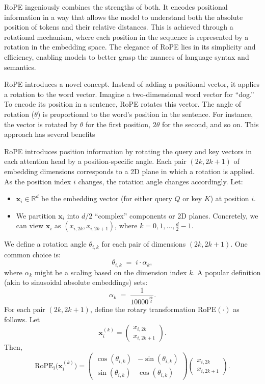 RoPE ingeniously combines the strengths of both. It encodes positional information in a way that allows the model to understand both the absolute position of tokens and their relative distances. This is achieved through a rotational mechanism, where each position in the sequence is represented by a rotation in the embedding space. The elegance of RoPE lies in its simplicity and efficiency, enabling models to better grasp the nuances of language syntax and semantics.

RoPE introduces a novel concept. Instead of adding a positional vector, it applies a rotation to the word vector. Imagine a two-dimensional word vector for ``dog.'' To encode its position in a sentence, RoPE rotates this vector. The angle of rotation ($\theta$) is proportional to the word's position in the sentence. For instance, the vector is rotated by $\theta$ for the first position, $2\theta$ for the second, and so on. This approach has several benefits

RoPE introduces position information by rotating the query and key vectors in each attention head by a position-specific angle. Each pair \((2k, 2k+1)\) of embedding dimensions corresponds to a 2D plane in which a rotation is applied. As the position index \(i\) changes, the rotation angle changes accordingly.
Let:
\begin{itemize}
	\item \( \mathbf{x}_i \in \mathbb{R}^d \) be the embedding vector (for either query \(Q\) or key \(K\)) at position \(i\).
	\item We partition \(\mathbf{x}_i\) into \(d/2\) ``complex'' components or 2D planes.  
	  Concretely, we can view \(\mathbf{x}_i\) as $(x_{i,2k}, x_{i,2k+1})$, where $k = 0, 1, \ldots, \frac{d}{2}-1$.
\end{itemize}


We define a rotation angle \(\theta_{i, k}\) for each pair of dimensions \((2k, 2k+1)\). One common choice is:
\[
\theta_{i, k} \;=\; i \cdot \alpha_k,
\]
where \(\alpha_k\) might be a scaling based on the dimension index \(k\). A popular definition (akin to sinusoidal absolute embeddings) sets:
\[
\alpha_k \;=\; \frac{1}{10000^{\frac{2k}{d}}}.
\]
For each pair \((2k, 2k+1)\), define the rotary transformation \(\text{RoPE}(\cdot)\) as follows. Let
\[
\mathbf{x}_i^{(k)} 
= \begin{pmatrix}
x_{i, 2k} \\[6pt]
x_{i, 2k+1}
\end{pmatrix}.
\]
Then,
\[
\text{RoPE}_i \bigl(\mathbf{x}_i^{(k)}\bigr)
= \begin{pmatrix}
\cos(\theta_{i, k}) & -\sin(\theta_{i, k}) \\
\sin(\theta_{i, k}) & \cos(\theta_{i, k})
\end{pmatrix}
\begin{pmatrix}
x_{i, 2k} \\[4pt]
x_{i, 2k+1}
\end{pmatrix}.
\]

